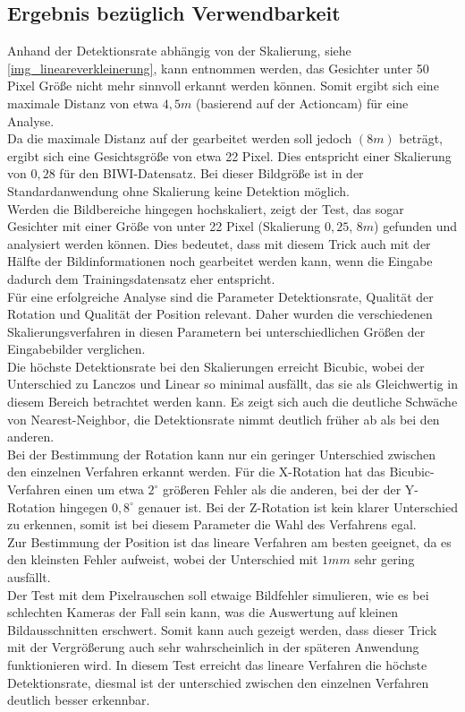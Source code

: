 \subsection{Ergebnis bezüglich Verwendbarkeit}
Anhand der Detektionsrate abhängig von der Skalierung, siehe \autoref{img_lineareverkleinerung}, kann entnommen werden, das Gesichter unter 50 Pixel Größe nicht mehr sinnvoll erkannt werden können. Somit ergibt sich eine maximale Distanz von etwa $4,5m$ (basierend auf der Actioncam) für eine Analyse.\\
Da die maximale Distanz auf der gearbeitet werden soll jedoch $(8m)$ beträgt, ergibt sich eine Gesichtsgröße von etwa 22 Pixel. Dies entspricht einer Skalierung von $0,28$ für den BIWI-Datensatz. Bei dieser Bildgröße ist in der Standardanwendung ohne Skalierung keine Detektion möglich.\\
Werden die Bildbereiche hingegen hochskaliert, zeigt der Test, das sogar Gesichter mit einer Größe von unter 22 Pixel (Skalierung $0,25$, $8m$) gefunden und analysiert werden können. Dies bedeutet, dass mit diesem Trick auch mit der Hälfte der Bildinformationen noch gearbeitet werden kann, wenn die Eingabe dadurch dem Trainingsdatensatz eher entspricht.\\
Für eine erfolgreiche Analyse sind die Parameter Detektionsrate, Qualität der Rotation und Qualität der Position relevant. Daher wurden die verschiedenen Skalierungsverfahren in diesen Parametern bei unterschiedlichen Größen der Eingabebilder verglichen.\\
Die höchste Detektionsrate bei den Skalierungen erreicht Bicubic, wobei der Unterschied zu Lanczos und Linear so minimal ausfällt, das sie als Gleichwertig in diesem Bereich betrachtet werden kann. Es zeigt sich auch die deutliche Schwäche von Nearest-Neighbor, die Detektionsrate nimmt deutlich früher ab als bei den anderen.\\
Bei der Bestimmung der Rotation kann nur ein geringer Unterschied zwischen den einzelnen Verfahren erkannt werden. Für die X-Rotation hat das Bicubic-Verfahren einen um etwa $2^\circ$ größeren Fehler als die anderen, bei der der Y-Rotation hingegen $0,8^\circ$ genauer ist. Bei der Z-Rotation ist kein klarer Unterschied zu erkennen, somit ist bei diesem Parameter die Wahl des Verfahrens egal.\\
Zur Bestimmung der Position ist das lineare Verfahren am besten geeignet, da es den kleinsten Fehler aufweist, wobei der Unterschied mit $1mm$ sehr gering ausfällt.\\
Der Test mit dem Pixelrauschen soll etwaige Bildfehler simulieren, wie es bei schlechten Kameras der Fall sein kann, was die Auswertung auf kleinen Bildausschnitten erschwert. Somit kann auch gezeigt werden, dass dieser Trick mit der Vergrößerung auch sehr wahrscheinlich in der späteren Anwendung funktionieren wird. In diesem Test erreicht das lineare Verfahren die höchste Detektionsrate, diesmal ist der unterschied zwischen den einzelnen Verfahren deutlich besser erkennbar.\\
